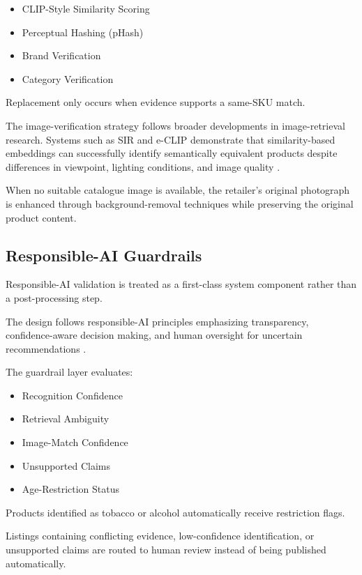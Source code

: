 \documentclass[conference]{IEEEtran}
\begin{document}
\begin{itemize}
\item CLIP-Style Similarity Scoring
\item Perceptual Hashing (pHash)
\item Brand Verification
\item Category Verification
\end{itemize}

Replacement only occurs when evidence supports a same-SKU match.

The image-verification strategy follows broader developments in
image-retrieval research. Systems such as SIR and e-CLIP demonstrate
that similarity-based embeddings can successfully identify
semantically equivalent products despite differences in viewpoint,
lighting conditions, and image quality
\cite{sir2020,eclip2022}.

When no suitable catalogue image is available, the retailer's
original photograph is enhanced through background-removal
techniques while preserving the original product content.

\subsection{Responsible-AI Guardrails}

Responsible-AI validation is treated as a first-class system
component rather than a post-processing step.

The design follows responsible-AI principles emphasizing
transparency, confidence-aware decision making, and human oversight
for uncertain recommendations \cite{li2024modict}.

The guardrail layer evaluates:

\begin{itemize}
\item Recognition Confidence
\item Retrieval Ambiguity
\item Image-Match Confidence
\item Unsupported Claims
\item Age-Restriction Status
\end{itemize}

Products identified as tobacco or alcohol automatically receive
restriction flags.

Listings containing conflicting evidence, low-confidence
identification, or unsupported claims are routed to human review
instead of being published automatically.
\end{document}
